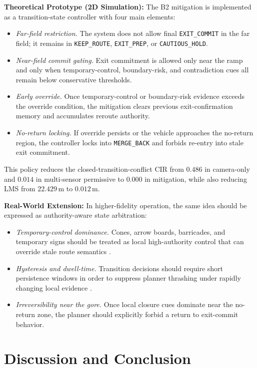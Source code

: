 \documentclass[sigconf,nonacm]{acmart}
\begin{document}
\textbf{Theoretical Prototype (2D Simulation):} The B2 mitigation is implemented as a transition-state controller with four main elements:
\begin{itemize}
    \item \textit{Far-field restriction.} The system does not allow final \texttt{EXIT\_COMMIT} in the far field; it remains in \texttt{KEEP\_ROUTE}, \texttt{EXIT\_PREP}, or \texttt{CAUTIOUS\_HOLD}.
    \item \textit{Near-field commit gating.} Exit commitment is allowed only near the ramp and only when temporary-control, boundary-risk, and contradiction cues all remain below conservative thresholds.
    \item \textit{Early override.} Once temporary-control or boundary-risk evidence exceeds the override condition, the mitigation clears previous exit-confirmation memory and accumulates reroute authority.
    \item \textit{No-return locking.} If override persists or the vehicle approaches the no-return region, the controller locks into \texttt{MERGE\_BACK} and forbids re-entry into stale exit commitment.
\end{itemize}

This policy reduces the closed-transition-conflict CIR from $0.486$ in camera-only and $0.014$ in multi-sensor permissive to $0.000$ in mitigation, while also reducing LMS from $22.429\,\mathrm{m}$ to $0.012\,\mathrm{m}$.

\textbf{Real-World Extension:} In higher-fidelity operation, the same idea should be expressed as authority-aware state arbitration:
\begin{itemize}
    \item \textit{Temporary-control dominance.} Cones, arrow boards, barricades, and temporary signs should be treated as local high-authority control that can override stale route semantics \cite{fhwa2008,fhwa2019}.
    \item \textit{Hysteresis and dwell-time.} Transition decisions should require short persistence windows in order to suppress planner thrashing under rapidly changing local evidence \cite{shalev2017}.
    \item \textit{Irreversibility near the gore.} Once local closure cues dominate near the no-return zone, the planner should explicitly forbid a return to exit-commit behavior.
\end{itemize}

\section{Discussion and Conclusion}
\end{document}
